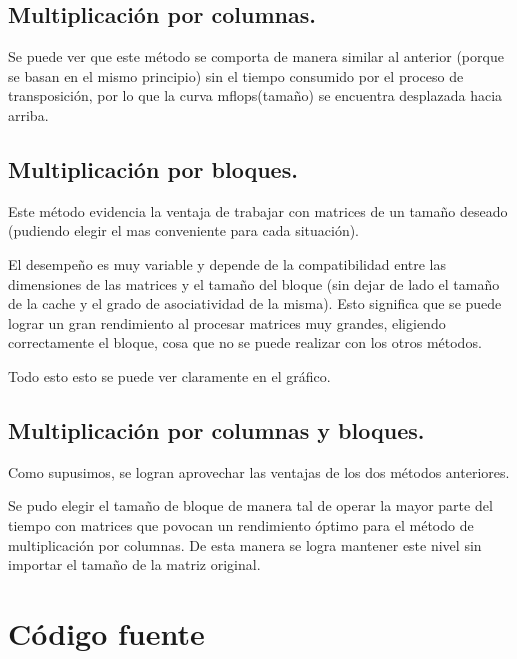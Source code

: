 \documentclass[a4paper,10pt]{article}
\begin{document}
\subsection{Multiplicación por columnas.}

Se puede ver que este método se comporta de manera similar al anterior (porque se basan en el mismo principio) sin el tiempo consumido por el proceso de transposición, por lo que la curva mflops(tamaño) se encuentra desplazada hacia arriba.

\subsection{Multiplicación por bloques.}

Este método evidencia la ventaja de trabajar con matrices de un tamaño deseado (pudiendo elegir el mas conveniente para cada situación).

El desempeño es muy variable y depende de la compatibilidad entre las dimensiones de las matrices y el tamaño del bloque (sin dejar de lado el tamaño de la cache y el grado de asociatividad de la misma). Esto significa que se puede lograr un gran rendimiento al procesar matrices muy grandes, eligiendo correctamente el bloque, cosa que no se puede realizar con los otros métodos. 

Todo esto esto se puede ver claramente en el gráfico.

\subsection{Multiplicación por columnas y bloques.}

Como supusimos, se logran aprovechar las ventajas de los dos métodos anteriores. 

Se pudo elegir el tamaño de bloque de manera tal de operar la mayor parte del tiempo con matrices que povocan un rendimiento óptimo para el método de multiplicación por columnas. De esta manera se logra mantener este nivel sin importar el tamaño de la matriz original.

\clearpage
\section{Código fuente}
\end{document}

